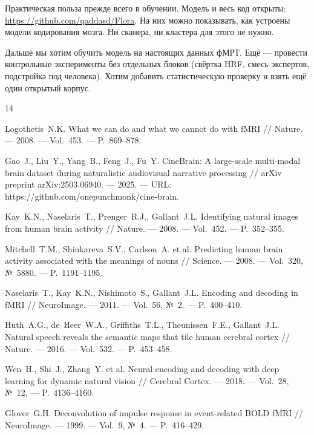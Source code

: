 \documentclass[12pt,a4paper]{article}
\begin{document}
Практическая польза прежде всего в обучении. Модель и весь код
открыты: \url{https://github.com/qaddasd/Flora}.
На них можно показывать, как устроены модели кодирования мозга. Ни
сканера, ни кластера для этого не нужно.

Дальше мы хотим обучить модель на настоящих данных фМРТ. Ещё —
провести контрольные эксперименты без отдельных блоков (свёртка HRF,
смесь экспертов, подстройка под человека). Хотим добавить
статистическую проверку и взять ещё один открытый корпус.

\renewcommand{\refname}{Список использованных источников}
\begin{thebibliography}{14}
\small\singlespacing

 Logothetis~N.K. What we can do and what we cannot
do with fMRI // Nature. — 2008. — Vol.~453. — P.~869–878.

 Gao~J., Liu~Y., Yang~B., Feng~J., Fu~Y. CineBrain:
A large-scale multi-modal brain dataset during naturalistic
audiovisual narrative processing // arXiv preprint arXiv:2503.06940. —
2025. — URL: https://github.com/onepunchmonk/cine-brain.

 Kay~K.N., Naselaris~T., Prenger~R.J., Gallant~J.L.
Identifying natural images from human brain activity // Nature. —
2008. — Vol.~452. — P.~352–355.

 Mitchell~T.M., Shinkareva~S.V., Carlson~A. et al.
Predicting human brain activity associated with the meanings of nouns
// Science. — 2008. — Vol.~320, №~5880. — P.~1191–1195.

 Naselaris~T., Kay~K.N., Nishimoto~S., Gallant~J.L.
Encoding and decoding in fMRI // NeuroImage. — 2011. — Vol.~56, №~2. —
P.~400–410.

 Huth~A.G., de~Heer~W.A., Griffiths~T.L., Theunissen~F.E.,
Gallant~J.L. Natural speech reveals the semantic maps that tile human
cerebral cortex // Nature. — 2016. — Vol.~532. — P.~453–458.

 Wen~H., Shi~J., Zhang~Y. et al. Neural encoding and
decoding with deep learning for dynamic natural vision // Cerebral
Cortex. — 2018. — Vol.~28, №~12. — P.~4136–4160.

 Glover~G.H. Deconvolution of impulse response in
event-related BOLD fMRI // NeuroImage. — 1999. — Vol.~9, №~4. —
P.~416–429.


\end{thebibliography}
\end{document}
